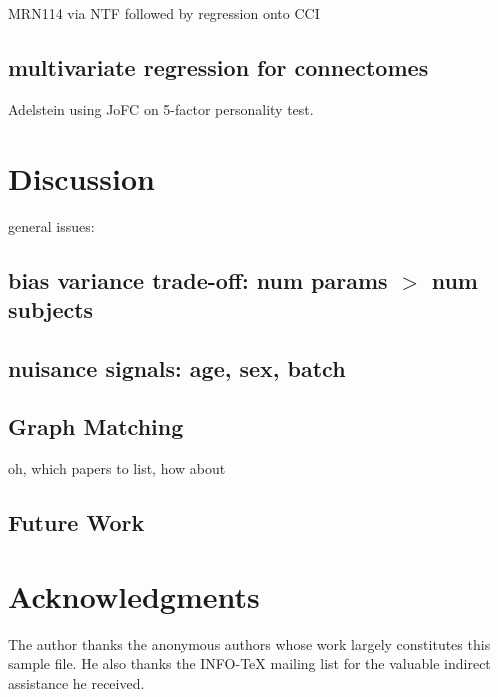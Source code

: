 \documentclass[final,leqno]{article}
\begin{document}
MRN114 via NTF followed by regression onto CCI

\subsection{multivariate regression for connectomes}

Adelstein \cite{Adelstein2011a} using JoFC on 5-factor personality test.


\section{Discussion}

general issues:

\subsection{bias variance trade-off: num params $>$ num subjects}

\subsection{nuisance signals: age, sex, batch}

\subsection{Graph Matching}

oh, which papers to list, how about \cite{VP11_FAQ,Fishkind2012a,sgm-jofc,Lyzinski2013}

\subsection{Future Work}


\section*{Acknowledgments}
The author thanks the anonymous authors whose work largely
constitutes this sample file. He also thanks the INFO-TeX mailing
list for the valuable indirect assistance he received.
 
 


\end{document}
